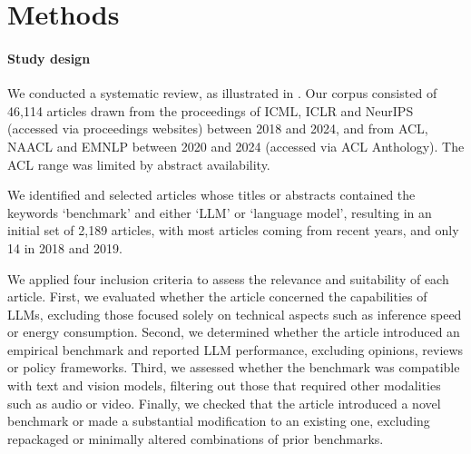 \section{Methods}

\paragraph{Study design}
\label{sec:selecting}
We conducted a systematic review, as illustrated in  . Our corpus consisted of 46,114 articles drawn from the proceedings of ICML, ICLR and NeurIPS (accessed via proceedings websites)  between 2018 and 2024, and from ACL, NAACL and EMNLP between 2020 and 2024 (accessed via ACL Anthology). The ACL range was limited by abstract availability.

We identified and selected articles whose titles or abstracts contained the keywords `benchmark' and either `LLM' or `language model', resulting in an initial set of 2,189 articles, with most articles coming from recent years, and only 14 in 2018 and 2019.

We applied four inclusion criteria to assess the relevance and suitability of each article. First, we evaluated whether the article concerned the capabilities of LLMs, excluding those focused solely on technical aspects such as inference speed or energy consumption. Second, we determined whether the article introduced an empirical benchmark and reported LLM performance, excluding opinions, reviews or policy frameworks. Third, we assessed whether the benchmark was compatible with text and vision models, filtering out those that required other modalities such as audio or video. Finally, we checked that the article introduced a novel benchmark or made a substantial modification to an existing one, excluding repackaged or minimally altered combinations of prior benchmarks. 




